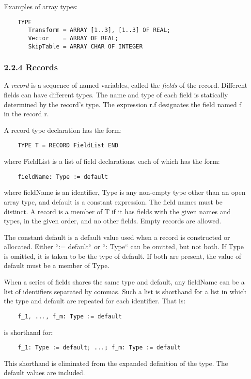 \documentclass[10pt]{article}
\begin{document}
  Examples of array types: 
\begin{verbatim}
    TYPE
       Transform = ARRAY [1..3], [1..3] OF REAL;
       Vector    = ARRAY OF REAL;
       SkipTable = ARRAY CHAR OF INTEGER
\end{verbatim}



 
\subsubsection*{2.2.4 Records}


  A \emph{record}
 is a sequence of named variables, called the \emph{fields}
 of the record. Different fields can have different types. The name and type of each field is statically determined by the record's type. The expression r.f designates the field named f in the record r. 


  A record type declaration has the form: 
\begin{verbatim}
    TYPE T = RECORD FieldList END
\end{verbatim}
 where FieldList is a list of field declarations, each of which has the form: 
\begin{verbatim}
    fieldName: Type := default
\end{verbatim}
 where fieldName is an identifier, Type is any non-empty type other than an open array type, and default is a constant expression. The field names must be distinct. A record is a member of T if it has fields with the given names and types, in the given order, and no other fields. Empty records are allowed. 


 The constant default is a default value used when a record is constructed or allocated. Either ``:= default`` or ``: Type`` can be omitted, but not both. If Type is omitted, it is taken to be the type of default. If both are present, the value of default must be a member of Type. 


  When a series of fields shares the same type and default, any fieldName can be a list of identifiers separated by commas. Such a list is shorthand for a list in which the type and default are repeated for each identifier. That is: 
\begin{verbatim}
    f_1, ..., f_m: Type := default
\end{verbatim}
 is shorthand for: 
\begin{verbatim}
    f_1: Type := default; ...; f_m: Type := default
\end{verbatim}
 This shorthand is eliminated from the expanded definition of the type. The default values are included. 
\end{document}
